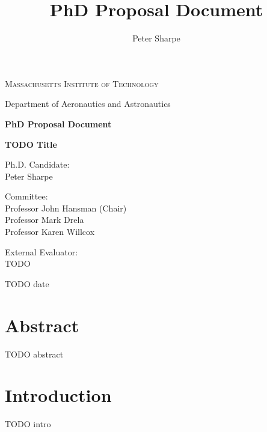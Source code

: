 \documentclass[12pt,vi,twoside]{article}
\title{PhD Proposal Document}
\author{Peter Sharpe}
\begin{document}
    \begin{center}

        \vspace*{1cm}

        \textsc{Massachusetts Institute of Technology}

        Department of Aeronautics and Astronautics

        \vspace{1cm}

        \textbf{PhD Proposal Document}

        \vspace{1cm}

        \textbf{\large TODO Title}

        \vspace{1cm}

        Ph.D. Candidate:\\
        Peter Sharpe

        \vspace{1cm}

        Committee:\\
        Professor John Hansman (Chair)\\
        Professor Mark Drela\\
        Professor Karen Willcox\\

        \vspace{1cm}

        External Evaluator:\\
        TODO

        \vspace{3cm}

        TODO date

    \end{center}

    \section*{Abstract}

    TODO abstract


    \tableofcontents


    \section{Introduction}

    TODO intro
\end{document}
